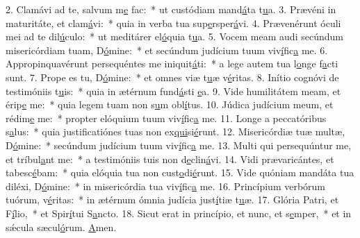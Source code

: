 2. Clamávi ad te, salvum m\uline{e} fac:~* ut custódiam mand\uline{á}ta t\uline{u}a.
3. Prævéni in maturitáte, et clam\uline{á}vi:~* quia in verba tua sup\uline{e}rsper\uline{á}vi.
4. Prævenérunt óculi mei ad te dil\uline{ú}culo:~* ut meditárer el\uline{ó}quia t\uline{u}a.
5. Vocem meam audi secúndum misericórdiam tuam, D\uline{ó}mine:~* et secúndum judícium tuum viv\uline{í}fic\uline{a} me.
6. Appropinquavérunt persequéntes me iniquit\uline{á}ti:~* a lege autem tua l\uline{o}nge f\uline{a}cti sunt.
7. Prope es tu, D\uline{ó}mine:~* et omnes viæ t\uline{u}æ v\uline{é}ritas.
8. Inítio cognóvi de testimóniis t\uline{u}is:~* quia in ætérnum fund\uline{á}sti \uline{e}a.
9. Vide humilitátem meam, et érip\uline{e} me:~* quia legem tuam non s\uline{u}m obl\uline{í}tus.
10. Júdica judícium meum, et rédim\uline{e} me:~* propter elóquium tuum viv\uline{í}fic\uline{a} me.
11. Longe a peccatóribus s\uline{a}lus:~* quia justificatiónes tuas non ex\uline{qui}si\uline{é}runt.
12. Misericórdiæ tuæ multæ, D\uline{ó}mine:~* secúndum judícium tuum viv\uline{í}fic\uline{a} me.
13. Multi qui persequúntur me, et tríbul\uline{a}nt me:~* a testimóniis tuis non d\uline{e}clin\uline{á}vi.
14. Vidi prævaricántes, et tabesc\uline{é}bam:~* quia elóquia tua non cust\uline{o}di\uline{é}runt.
15. Vide quóniam mandáta tua diléxi, D\uline{ó}mine:~* in misericórdia tua viv\uline{í}fic\uline{a} me.
16. Princípium verbórum tuórum, v\uline{é}ritas:~* in ætérnum ómnia judícia just\uline{í}tiæ t\uline{u}æ.
17. Glória Patri, et F\uline{í}lio,~* et Spir\uline{í}tui S\uline{a}ncto.
18. Sicut erat in princípio, et nunc, et s\uline{e}mper,~* et in sǽcula sæcul\uline{ó}rum. \uline{A}men.
